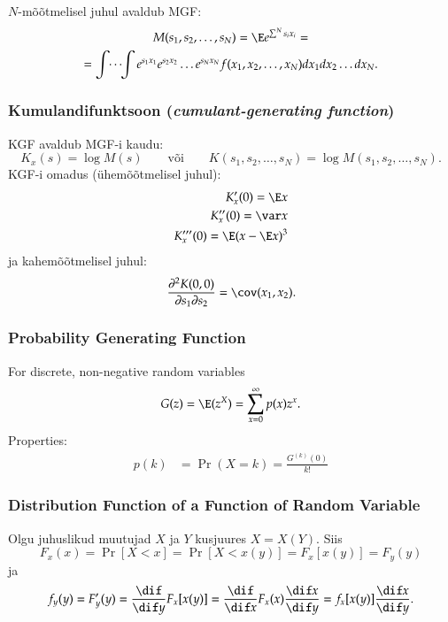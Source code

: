 \documentclass[a4paper]{article}
\numberwithin{equation}{subsection}
\begin{document}
$N$-mõõtmelisel juhul avaldub MGF:
\begin{multline}
M( s_1,s_2,\ldots,s_N) = \E e^{\sum^N s_i x_i} = \\
= \idotsint e^{s_1 x_1}
  e^{s_2 x_2} \ldots e^{s_N x_N} f(x_1,x_2,\ldots, x_N) dx_1 dx_2 \ldots
  dx_N. 
\end{multline}

\subsubsection{Kumulandifunktsoon (\emph{cumulant-generating function})}

KGF avaldub MGF-i kaudu:
\begin{equation}
K_x(s) = \log M(s) 
  \qquad \mbox{või} \qquad
K(s_1,s_2,\ldots,s_N) = \log M( s_1,s_2,\ldots,s_N).
\end{equation}
KGF-i omadus (ühemõõtmelisel juhul):
\begin{eqnarray}
K_x'(0) = \E x \\
K_x''(0) = \var x\\
K_x'''(0) = \E(x-\E x)^3
\end{eqnarray}
ja kahemõõtmelisel juhul:
\begin{equation}
\frac{\partial^2 K(0,0)}{\partial s_1 \partial s_2} =
  \cov( x_1, x_2).
\end{equation}


\subsubsection{Probability Generating Function}
\label{sec:probability_generating_function}

For discrete, non-negative random variables
\begin{equation}
  G(z) = \E (z^X) = \sum_{x=0}^{\infty}p(x)z^x.
\end{equation}
Properties:
\begin{align}
  p(k) &= \operatorname{Pr}(X = k) = \frac{G^{(k)}(0)}{k!}
\end{align}

\subsubsection{Distribution Function of a Function of Random Variable}
Olgu juhuslikud muutujad $X$ ja $Y$ kusjuures $X=X(Y)$.  Siis
\begin{equation}
  F_x(x) = \Pr[X < x] = \Pr[X < x(y)] = F_x[x(y)] = F_y(y)
\end{equation}
ja
\begin{equation}
  f_y(y) = F_y'(y) = \frac{\dif}{\dif y} F_x[x(y)] =
  \frac{\dif}{\dif x} F_x(x) \frac{\dif x}{\dif y} = f_x[x(y)]
  \frac{\dif x}{\dif y}. 
\end{equation}
\end{document}
